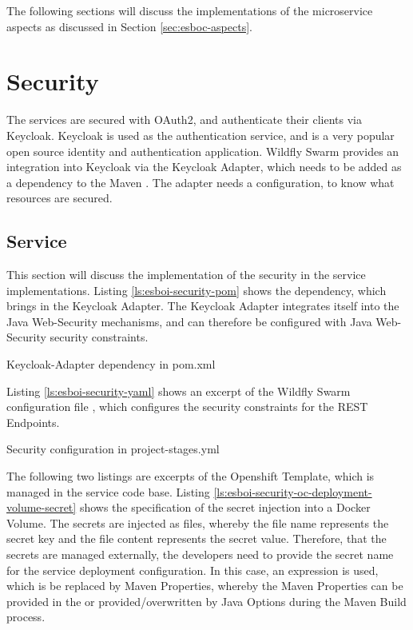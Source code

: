 The following sections will discuss the implementations of the microservice aspects as discussed in Section \vref{sec:esboc-aspects}.

\section{Security}
\label{sec:esbi-security}
The services are secured with OAuth2, and authenticate their clients via Keycloak. Keycloak is used as the authentication service, and is a very popular open source identity and authentication application. Wildfly Swarm provides an integration into Keycloak via the Keycloak Adapter, which needs to be added as a dependency to the Maven . The adapter needs a configuration, to know what resources are secured.

\subsection{Service}
\label{sec:esbi-security-service}
This section will discuss the implementation of the security in the service implementations. Listing \vref{ls:esboi-security-pom} shows the dependency, which brings in the Keycloak Adapter. The Keycloak Adapter integrates itself into the Java Web-Security mechanisms, and can therefore be configured with Java Web-Security security constraints.

\begin{listing}[h]
	\caption{Keycloak-Adapter dependency in pom.xml}
	\label{ls:esboi-security-pom}
\end{listing}

Listing \vref{ls:esboi-security-yaml} shows an excerpt of the Wildfly Swarm configuration file , which configures the security constraints for the REST Endpoints.

\begin{listing}[h]
	\caption{Security configuration in project-stages.yml}
	\label{ls:esboi-security-yaml}
\end{listing}

The following two listings are excerpts of the  Openshift Template, which is managed in the service code base. Listing \vref{ls:esboi-security-oc-deployment-volume-secret} shows the specification of the secret injection into a Docker Volume. The secrets are injected as files, whereby the file name represents the secret key and the file content represents the secret value. Therefore, that the secrets are managed externally, the developers need to provide the secret name for the service deployment configuration. In this case, an expression is used, which is be replaced by Maven Properties, whereby the Maven Properties can be provided in the  or provided/overwritten by Java Options during the Maven Build process.

